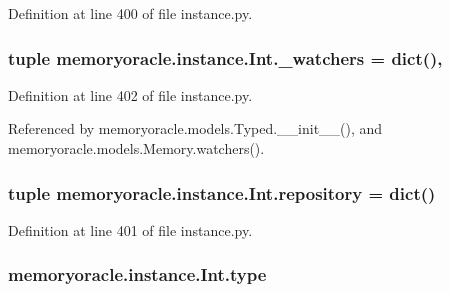 Definition at line 400 of file instance.\+py.

\hypertarget{classmemoryoracle_1_1instance_1_1Int_a36bd92d1d7bdd201909ee915c8aee98d}{}
\subsubsection[{\+\_\+watchers}]{\setlength{\rightskip}{0pt plus 5cm}tuple memoryoracle.\+instance.\+Int.\+\_\+watchers = dict()\hspace{0.3cm}{\ttfamily [static]}, {\ttfamily [private]}}\label{classmemoryoracle_1_1instance_1_1Int_a36bd92d1d7bdd201909ee915c8aee98d}


Definition at line 402 of file instance.\+py.



Referenced by memoryoracle.\+models.\+Typed.\+\_\+\+\_\+init\+\_\+\+\_\+(), and memoryoracle.\+models.\+Memory.\+watchers().

\hypertarget{classmemoryoracle_1_1instance_1_1Int_a47c30a67515de0d4f90403c5c16fa6ed}{}
\subsubsection[{repository}]{\setlength{\rightskip}{0pt plus 5cm}tuple memoryoracle.\+instance.\+Int.\+repository = dict()\hspace{0.3cm}{\ttfamily [static]}}\label{classmemoryoracle_1_1instance_1_1Int_a47c30a67515de0d4f90403c5c16fa6ed}


Definition at line 401 of file instance.\+py.

\hypertarget{classmemoryoracle_1_1instance_1_1Int_a5c870c1de0a0c49600e25d801c410d51}{}
\subsubsection[{type}]{\setlength{\rightskip}{0pt plus 5cm}memoryoracle.\+instance.\+Int.\+type}\label{classmemoryoracle_1_1instance_1_1Int_a5c870c1de0a0c49600e25d801c410d51}


